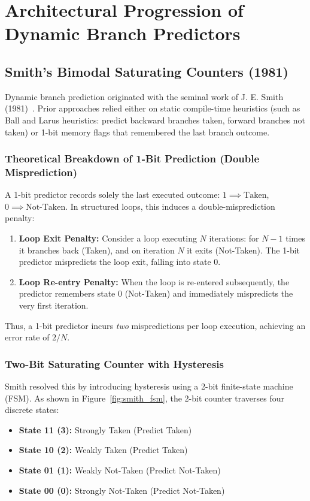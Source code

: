 \documentclass[11pt,a4paper]{article}
\begin{document}
\section{Architectural Progression of Dynamic Branch Predictors}
\label{sec:progression}

\subsection{Smith's Bimodal Saturating Counters (1981)}
\label{sec:smith}
Dynamic branch prediction originated with the seminal work of J. E. Smith (1981)~\cite{smith1981}. Prior approaches relied either on static compile-time heuristics (such as Ball and Larus heuristics: predict backward branches taken, forward branches not taken) or 1-bit memory flags that remembered the last branch outcome.

\subsubsection{Theoretical Breakdown of 1-Bit Prediction (Double Misprediction)}
A 1-bit predictor records solely the last executed outcome: $1 \implies \text{Taken}$, $0 \implies \text{Not-Taken}$. In structured loops, this induces a double-misprediction penalty:
\begin{enumerate}[leftmargin=1.8em, itemsep=0.3em]
    \item \textbf{Loop Exit Penalty:} Consider a loop executing $N$ iterations: for $N-1$ times it branches back (Taken), and on iteration $N$ it exits (Not-Taken). The 1-bit predictor mispredicts the loop exit, falling into state 0.
    \item \textbf{Loop Re-entry Penalty:} When the loop is re-entered subsequently, the predictor remembers state 0 (Not-Taken) and immediately mispredicts the very first iteration.
\end{enumerate}
Thus, a 1-bit predictor incurs \textit{two} mispredictions per loop execution, achieving an error rate of $2/N$.

\subsubsection{Two-Bit Saturating Counter with Hysteresis}
Smith resolved this by introducing hysteresis using a 2-bit finite-state machine (FSM). As shown in Figure~\ref{fig:smith_fsm}, the 2-bit counter traverses four discrete states:
\begin{itemize}[leftmargin=1.5em, itemsep=0.2em]
    \item \textbf{State 11 (3):} Strongly Taken (Predict Taken)
    \item \textbf{State 10 (2):} Weakly Taken (Predict Taken)
    \item \textbf{State 01 (1):} Weakly Not-Taken (Predict Not-Taken)
    \item \textbf{State 00 (0):} Strongly Not-Taken (Predict Not-Taken)
\end{itemize}
\end{document}
